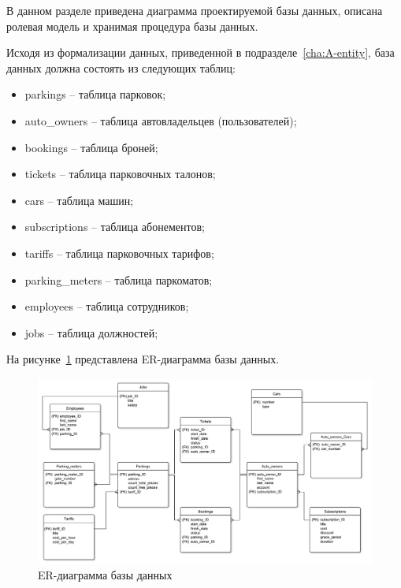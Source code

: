 \label{cha:C}

В данном разделе приведена диаграмма проектируемой базы данных, описана ролевая модель и хранимая процедура базы данных.

Исходя из формализации данных, приведенной в подразделе~\ref{cha:A-entity}, база данных должна состоять из следующих таблиц:
\begin{itemize}
	\item parkings -- таблица парковок;
	\item auto\_owners -- таблица автовладельцев (пользователей);
	\item bookings -- таблица броней;
	\item tickets -- таблица парковочных талонов;
	\item cars -- таблица машин;
	\item subscriptions -- таблица абонементов;
	\item tariffs -- таблица парковочных тарифов;
	\item parking\_meters -- таблица паркоматов;
	\item employees -- таблица сотрудников;
	\item jobs -- таблица должностей;
\end{itemize}

На рисунке~\ref{fig:DB_diagram} представлена ER-диаграмма базы данных.

\begin{figure}[h]
	\centering
	\includegraphics[width=1\textwidth, height=0.4\textheight]{svg/DB_diagram}
	\caption{ER-диаграмма базы данных}
	\label{fig:DB_diagram}
\end{figure}

